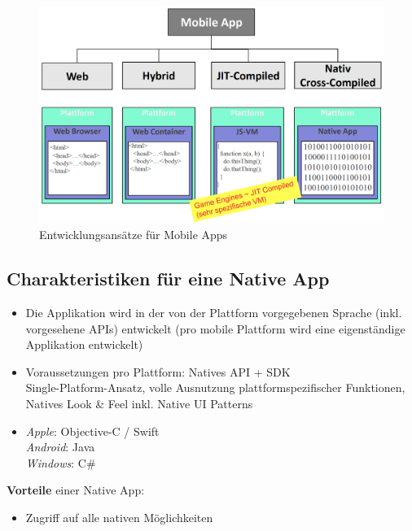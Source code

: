 \documentclass[a4paper]{article}
\begin{document}
{\begin{itemize}
	\end{itemize}

	\begin{figure}[!htb]
		\centering
		\includegraphics[width=.8\textwidth]{img/android8/entwicklung_mobileapps.png}
		\caption{Entwicklungsansätze für Mobile Apps}
		\label{fig:entwicklung_mobapps}
	\end{figure}

	\newpage
	
	\subsection{Charakteristiken für eine Native App}
	
	\begin{itemize}
		
		\item Die Applikation wird in der von der Plattform vorgegebenen Sprache (inkl. vorgesehene APIs) entwickelt (pro mobile Plattform wird eine eigenständige Applikation entwickelt)
		
		\item Voraussetzungen pro Plattform: Natives API + SDK\\
		Single-Platform-Ansatz, volle Ausnutzung plattformspezifischer Funktionen, Natives Look \& Feel inkl. Native UI Patterns
		
		\item \textit{Apple}: Objective-C / Swift\\
				\textit{Android}: Java\\
				\textit{Windows}: C\#
		
	\end{itemize}
	\vspace{1em}
	\textbf{Vorteile} einer Native App:
	\begin{itemize}
		
		\item Zugriff auf alle nativen Möglichkeiten
		

\end{itemize}}
\end{document}
